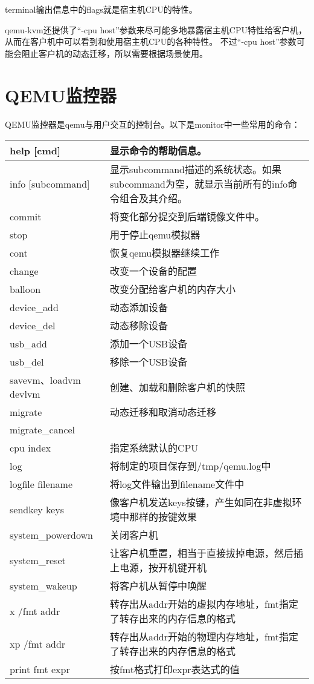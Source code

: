 \documentclass[a4paper,left=2.5cm,right=2.5cm,11pt]{article}
\newcommand{\interval}{\vspace{0.5em}}
\begin{document}
	terminal输出信息中的flags就是宿主机CPU的特性。\par

	qemu-kvm还提供了“-cpu host”参数来尽可能多地暴露宿主机CPU特性给客户机，从而在客户机中可以看到和使用宿主机CPU的各种特性。
	不过“-cpu host”参数可能会阻止客户机的动态迁移，所以需要根据场景使用。

\clearpage

\section{QEMU监控器}
	QEMU监控器是qemu与用户交互的控制台。以下是monitor中一些常用的命令：
	\interval
	\begin{longtable}{p{3cm}p{10cm}}
	\hline
	help [cmd] & 显示命令的帮助信息。 \\
	\hline
	info [subcommand] & 显示subcommand描述的系统状态。如果subcommand为空，就显示当前所有的info命令组合及其介绍。 \\
	\hline
	commit & 将变化部分提交到后端镜像文件中。 \\
	\hline
	stop & 用于停止qemu模拟器 \\
	\hline
	cont & 恢复qemu模拟器继续工作 \\
	\hline
	change & 改变一个设备的配置 \\
	\hline
	balloon & 改变分配给客户机的内存大小 \\
	\hline
	device\_add & 动态添加设备 \\
	\hline
	device\_del & 动态移除设备 \\
	\hline
	usb\_add & 添加一个USB设备 \\
	\hline
	usb\_del & 移除一个USB设备 \\
	\hline
	savevm、loadvm devlvm & 创建、加载和删除客户机的快照 \\
	\hline
	migrate  & 动态迁移和取消动态迁移 \\
	migrate\_cancel & \\
	\hline
	cpu index & 指定系统默认的CPU \\
	\hline
	log & 将制定的项目保存到/tmp/qemu.log中 \\
	\hline
	logfile filename & 将log文件输出到filename文件中 \\
	\hline
	sendkey keys & 像客户机发送keys按键，产生如同在非虚拟环境中那样的按键效果 \\
	\hline
	system\_powerdown & 关闭客户机 \\
	\hline
	system\_reset & 让客户机重置，相当于直接拔掉电源，然后插上电源，按开机键开机 \\
	\hline
	system\_wakeup & 将客户机从暂停中唤醒 \\
	\hline
	x /fmt addr & 转存出从addr开始的虚拟内存地址，fmt指定了转存出来的内存信息的格式 \\
	\hline
	xp /fmt addr & 转存出从addr开始的物理内存地址，fmt指定了转存出来的内存信息的格式 \\
	\hline
	print fmt expr & 按fmt格式打印expr表达式的值 \\
	\hline
	\end{longtable}
\end{document}
